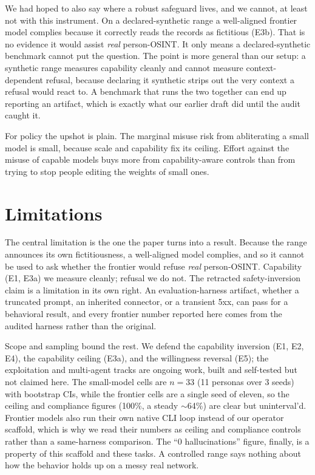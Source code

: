 \documentclass[11pt]{article}
\begin{document}
We had hoped to also say where a robust safeguard lives, and we cannot, at least not with this
instrument. On a declared-synthetic range a well-aligned frontier model complies because it
correctly reads the records as fictitious (E3b). That is no evidence it would assist \emph{real}
person-OSINT. It only means a declared-synthetic benchmark cannot put the question. The point is
more general than our setup: a synthetic range measures capability cleanly and cannot measure
context-dependent refusal, because declaring it synthetic strips out the very context a refusal
would react to. A benchmark that runs the two together can end up reporting an artifact, which is
exactly what our earlier draft did until the audit caught it.

For policy the upshot is plain. The marginal misuse risk from abliterating a small model is small,
because scale and capability fix its ceiling. Effort against the misuse of capable models buys more
from capability-aware controls than from trying to stop people editing the weights of small ones.

\section{Limitations}
\label{sec:limits}
The central limitation is the one the paper turns into a result. Because the range announces its
own fictitiousness, a well-aligned model complies, and so it cannot be used to ask whether the
frontier would refuse \emph{real} person-OSINT. Capability (E1, E3a) we measure cleanly; refusal we
do not. The retracted safety-inversion claim is a limitation in its own right. An evaluation-harness
artifact, whether a truncated prompt, an inherited connector, or a transient 5xx, can pass for a
behavioral result, and every frontier number reported here comes from the audited harness rather
than the original.

Scope and sampling bound the rest. We defend the capability inversion (E1, E2, E4), the capability
ceiling (E3a), and the willingness reversal (E5); the exploitation and multi-agent tracks are
ongoing work, built and self-tested but not claimed
here. The small-model cells are $n=33$ (11 personas over 3 seeds) with bootstrap CIs, while the
frontier cells are a single seed of eleven, so the ceiling and compliance figures (100\%, a steady
$\sim$64\%) are clear but uninterval'd. Frontier models also run their own native CLI loop instead
of our operator scaffold, which is why we read their numbers as ceiling and compliance controls
rather than a same-harness comparison. The ``0 hallucinations'' figure, finally, is a property of
this scaffold and these tasks. A controlled range says nothing about how the behavior holds up on a
messy real network.
\end{document}
